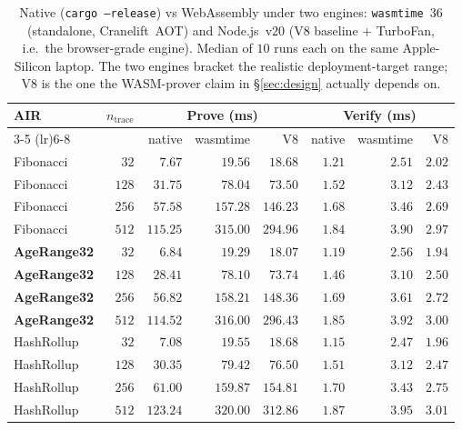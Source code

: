 \documentclass[11pt,a4paper]{article}
\begin{document}
\begin{table}[h]
  \centering
  \caption{Native (\texttt{cargo --release}) vs WebAssembly under
    two engines: \texttt{wasmtime}~36 (standalone, Cranelift~AOT)
    and Node.js~v20 (V8 baseline + TurboFan, i.e.\ the
    browser\nobreakdash-grade engine).  Median of $10$ runs each on
    the same Apple\nobreakdash-Silicon laptop.  The two engines
    bracket the realistic deployment\nobreakdash-target range; V8 is
    the one the WASM\nobreakdash-prover claim in
    \S\ref{sec:design} actually depends on.}
  \label{tab:wasm}
  \begin{tabular}{l r r r r r r r}
    \toprule
    \textbf{AIR} & $n_\mathrm{trace}$ &
      \multicolumn{3}{c}{\textbf{Prove (ms)}} &
      \multicolumn{3}{c}{\textbf{Verify (ms)}} \\
    \cmidrule(lr){3-5} \cmidrule(lr){6-8}
                 &       & native & wasmtime & V8 & native & wasmtime & V8 \\
    \midrule
    Fibonacci  &  $32$ &   $7.67$ &  $19.56$ &  $18.68$ & $1.21$ & $2.51$ & $2.02$ \\
    Fibonacci  & $128$ &  $31.75$ &  $78.04$ &  $73.50$ & $1.52$ & $3.12$ & $2.43$ \\
    Fibonacci  & $256$ &  $57.58$ & $157.28$ & $146.23$ & $1.68$ & $3.46$ & $2.69$ \\
    Fibonacci  & $512$ & $115.25$ & $315.00$ & $294.96$ & $1.84$ & $3.90$ & $2.97$ \\
    \midrule
    \textbf{AgeRange32} &  $32$ & $\mathbf{6.84}$ & $\mathbf{19.29}$ & $\mathbf{18.07}$ & $\mathbf{1.19}$ & $\mathbf{2.56}$ & $\mathbf{1.94}$ \\
    \textbf{AgeRange32} & $128$ &  $28.41$ &  $78.10$ &  $73.74$ & $1.46$ & $3.10$ & $2.50$ \\
    \textbf{AgeRange32} & $256$ &  $56.82$ & $158.21$ & $148.36$ & $1.69$ & $3.61$ & $2.72$ \\
    \textbf{AgeRange32} & $512$ & $114.52$ & $316.00$ & $296.43$ & $1.85$ & $3.92$ & $3.00$ \\
    \midrule
    HashRollup &  $32$ &   $7.08$ &  $19.55$ &  $18.68$ & $1.15$ & $2.47$ & $1.96$ \\
    HashRollup & $128$ &  $30.35$ &  $79.42$ &  $76.50$ & $1.51$ & $3.12$ & $2.47$ \\
    HashRollup & $256$ &  $61.00$ & $159.87$ & $154.81$ & $1.70$ & $3.43$ & $2.75$ \\
    HashRollup & $512$ & $123.24$ & $320.00$ & $312.86$ & $1.87$ & $3.95$ & $3.01$ \\

\end{tabular}
\end{table}
\end{document}
